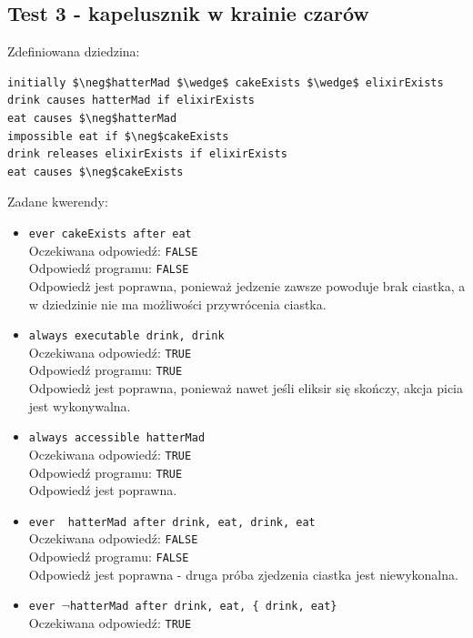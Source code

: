 \documentclass{article}
\begin{document}
\subsection{Test 3 - kapelusznik w krainie czarów}
Zdefiniowana dziedzina:
\bigskip
{}
\begin{lstlisting}[mathescape=true]
initially $\neg$hatterMad $\wedge$ cakeExists $\wedge$ elixirExists
drink causes hatterMad if elixirExists
eat causes $\neg$hatterMad
impossible eat if $\neg$cakeExists
drink releases elixirExists if elixirExists
eat causes $\neg$cakeExists
\end{lstlisting}
\vspace{1cm}
Zadane kwerendy:
\begin{itemize}
    \item {\large\texttt{ever cakeExists after eat}}\\
    Oczekiwana odpowiedź: \texttt{FALSE}\\
    Odpowiedź programu: \texttt{FALSE}\\
    Odpowiedż jest poprawna, ponieważ jedzenie zawsze powoduje brak ciastka, a w dziedzinie nie ma możliwości przywrócenia ciastka.
    \item {\large\texttt{always executable drink, drink}}\\
    Oczekiwana odpowiedź: \texttt{TRUE}\\
    Odpowiedź programu: \texttt{TRUE}\\
    Odpowiedż jest poprawna, ponieważ nawet jeśli eliksir się skończy, akcja picia jest wykonywalna.
    \item {\large\texttt{always accessible hatterMad}}\\
    Oczekiwana odpowiedź: \texttt{TRUE}\\
    Odpowiedź programu: \texttt{TRUE}\\
    Odpowiedź jest poprawna.
    \item {\large\texttt{ever ~hatterMad after drink, eat, drink, eat}}\\
    Oczekiwana odpowiedź: \texttt{FALSE}\\
    Odpowiedź programu: \texttt{FALSE}\\
    Odpowiedż jest poprawna - druga próba zjedzenia ciastka jest niewykonalna.
    \newpage
    \item {\large\texttt{ever $\neg$hatterMad after drink, eat, \{ drink, eat\} }}\\
    Oczekiwana odpowiedź: \texttt{TRUE}\\

\end{itemize}
\end{document}
